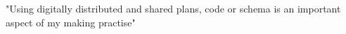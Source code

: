 "Using digitally distributed and shared plans, code or schema is an important aspect of my making practise"